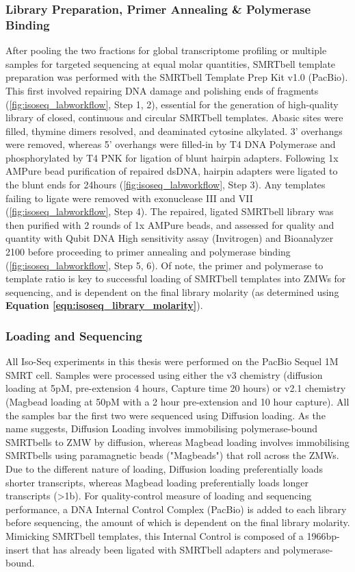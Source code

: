 \subsubsection{Library Preparation, Primer Annealing \& Polymerase Binding}
\label{section:ch2_smrtbelltemplate_explanation} 
After pooling the two fractions for global transcriptome profiling or multiple samples for targeted sequencing at equal molar quantities, SMRTbell template preparation was performed with the SMRTbell Template Prep Kit v1.0 (PacBio). This first involved repairing DNA damage and polishing ends of fragments (\cref{fig:isoseq_labworkflow}, Step 1, 2), essential for the generation of high-quality library of closed, continuous and circular SMRTbell templates. Abasic sites were filled, thymine dimers resolved, and deaminated cytosine alkylated. 3’ overhangs were removed, whereas 5’ overhangs were filled-in by T4 DNA Polymerase and phosphorylated by T4 PNK for ligation of blunt hairpin adapters. Following 1x AMPure bead purification of repaired dsDNA, hairpin adapters were ligated to the blunt ends for 24hours (\cref{fig:isoseq_labworkflow}, Step 3). Any templates failing to ligate were removed with exonuclease III and VII (\cref{fig:isoseq_labworkflow}, Step 4). The repaired, ligated SMRTbell library was then purified with 2 rounds of 1x AMPure beads, and assessed for quality and quantity with Qubit DNA High sensitivity assay (Invitrogen) and Bioanalyzer 2100 before proceeding to primer annealing and polymerase binding (\cref{fig:isoseq_labworkflow}, Step 5, 6). Of note, the primer and polymerase to template ratio is key to successful loading of SMRTbell templates into ZMWs for sequencing, and is dependent on the final library molarity (as determined using \textbf{Equation \ref{eqn:isoseq_library_molarity}}). 


\subsubsection{Loading and Sequencing} 
\label{section:ch2_sequencing}
All Iso-Seq experiments in this thesis were performed on the PacBio Sequel 1M SMRT cell. Samples were processed using either the v3 chemistry (diffusion loading at 5pM, pre-extension 4 hours, Capture time 20 hours) or v2.1 chemistry (Magbead loading at 50pM with a 2 hour pre-extension and 10 hour capture). All the samples bar the first two were sequenced using Diffusion loading. As the name suggests, Diffusion Loading involves immobilising polymerase-bound SMRTbells to ZMW by diffusion, whereas Magbead loading involves immobilising SMRTbells using paramagnetic beads ("Magbeads") that roll across the ZMWs. Due to the different nature of loading, Diffusion loading preferentially loads shorter transcripts, whereas Magbead loading preferentially loads longer transcripts (>1b). For quality-control measure of loading and sequencing performance, a DNA Internal Control Complex (PacBio) is added to each library before sequencing, the amount of which is dependent on the final library molarity. Mimicking SMRTbell templates, this Internal Control is composed of a 1966bp-insert that has already been ligated with SMRTbell adapters and polymerase-bound.


